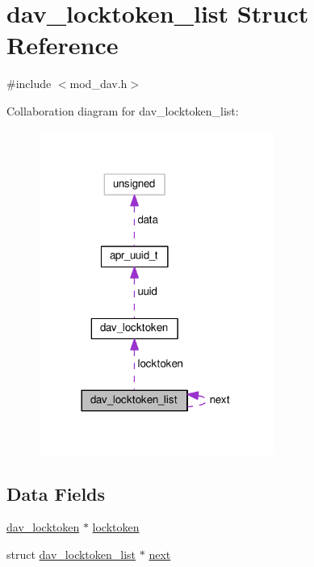 \hypertarget{structdav__locktoken__list}{}\section{dav\+\_\+locktoken\+\_\+list Struct Reference}
\label{structdav__locktoken__list}


{\ttfamily \#include $<$mod\+\_\+dav.\+h$>$}



Collaboration diagram for dav\+\_\+locktoken\+\_\+list\+:
\nopagebreak
\begin{figure}[H]
\begin{center}
\leavevmode
\includegraphics[width=218pt]{structdav__locktoken__list__coll__graph}
\end{center}
\end{figure}
\subsection*{Data Fields}
\begin{DoxyCompactItemize}
\item 
\hyperlink{structdav__locktoken}{dav\+\_\+locktoken} $\ast$ \hyperlink{structdav__locktoken__list_ab9db3300c9962b8c25bd926c8136f92a}{locktoken}
\item 
struct \hyperlink{structdav__locktoken__list}{dav\+\_\+locktoken\+\_\+list} $\ast$ \hyperlink{structdav__locktoken__list_a24086930c97085ed9d3a0a7175b41c89}{next}
\end{DoxyCompactItemize}


